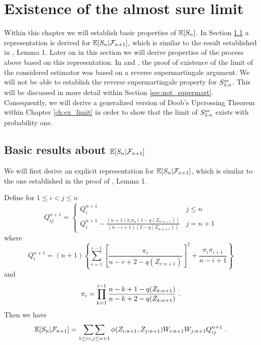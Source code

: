 \chapter{Existence of the almost sure limit}

 Within this chapter we will establish basic properties of $\mathbb{E}[S_n]$. In Section \ref{sec:representation} a representation is derived for $\mathbb{E}[S_n|\mathcal{F}_{n+1}]$, which is similar to the result established in \cite{bose1999strong}, Lemma 1. Later on in this section we will derive properties of the process above based on this representation. In \cite{bose1999strong} and \cite{dikta1998semiparametric}, the proof of existence of the limit of the considered estimator was based on a reverse supermartingale argument. We will not be able to establish the reverse supermartingale property for $S_{2,n}^{se}$. This will be discussed in more detail within Section \ref{sec:not_supermart}. Consequently, we will derive a generalized version of Doob's Upcrossing Theorem within Chapter \ref{ch:ex_limit} in order to show that the limit of $S_{2,n}^{se}$ exists with probability one.
%
%
%
\section{Basic results about $\mathbb{E}[S_{n}|\mathcal{F}_{n+1}]$} \label{sec:representation}
%
We will first derive an explicit representation for $\mathbb{E}[S_{n}|\mathcal{F}_{n+1}]$, which is similar to the one established in the proof of \cite{bose1999strong}, Lemma 1.
\begin{lemma} \label{lem:qi}
Define for $1\leq i<j\leq n$
\[Q_{ij}^{n+1} = \begin{cases} 
      Q_i^{n+1} & j\leq n \\
      Q_i^{n+1} - \frac{(n+1)\pi_i \pi_n (1-q(Z_{n:n+1}))}{(n-i+1)(2-q(Z_{n:n+1}))} & j=n+1
   \end{cases}
\]
%
where
\begin{equation}
	Q_i^{n+1} = (n+1) \left\{ \sum\limits_{r=1}^{i-1} \left[ \frac{\pi_r}{n-r+2-q(Z_{r:n+1})} \right]^2 + \frac{\pi_i\pi_{i+1}}{n-i+1} \right\}
	\label{eq:qi}
\end{equation}
and 
$$\pi_i = \prod\limits_{k=1}^{i-1} \frac{n-k+1-q(Z_{k:n+1})}{n-k+2-q(Z_{k:n+1})}\textrm{ .}$$
Then we have
$$\mathbb{E}[S_{n}|\mathcal{F}_{n+1}] = \mathop{\sum\sum}\limits_{1\leq i<j \leq n+1} \phi(Z_{i:n+1},Z_{j:n+1}) W_{i:n+1}W_{j:n+1}Q_{ij}^{n+1}\textrm{ .}$$
\end{lemma}

